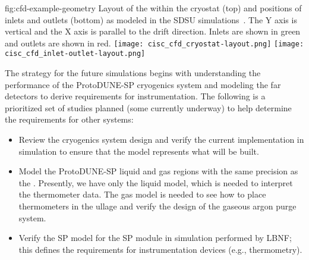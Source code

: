 \begin{dunefigure}{fig:cfd-example-geometry}
  {Layout of the  within the cryostat (top) and positions of  inlets and outlets (bottom) as modeled in the SDSU  simulations~\cite{docdb-5915}. The Y axis is vertical and the X axis is parallel to the  drift direction. Inlets are shown in green and outlets are shown in red.}
  \texttt{[image: cisc\_cfd\_cryostat-layout.png]}
  \texttt{[image: cisc\_cfd\_inlet-outlet-layout.png]}
\end{dunefigure}

The strategy for the future  simulations begins with understanding the performance of the ProtoDUNE-SP cryogenics system and modeling the far detectors to derive requirements for instrumentation. The following is a prioritized set of studies planned (some currently underway) to help determine the requirements for other systems:
\begin{itemize}
\item Review the   cryogenics system design and verify the current implementation in simulation to ensure that the model represents what will be built.
\item 
Model the ProtoDUNE-SP liquid and gas regions with the same precision as the . Presently, we have only the liquid model, which is needed to interpret the thermometer data. The gas model is needed to see how to place thermometers in the ullage and verify the design of the gaseous argon purge system.
\item Verify the SP  model for the  SP module in simulation performed by LBNF; this defines the requirements for instrumentation devices (e.g., thermometry).
\end{itemize}


